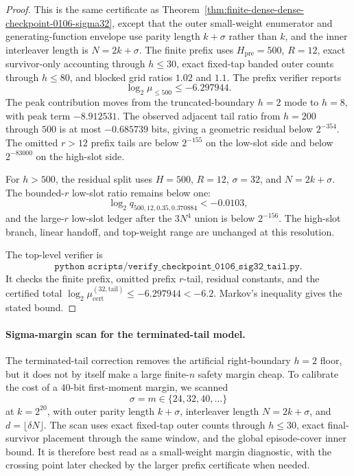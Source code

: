 \begin{proof}
This is the same certificate as Theorem~\ref{thm:finite-dense-dense-checkpoint-0106-sigma32}, except that the outer
small-weight enumerator and generating-function envelope use parity length \(k+\sigma\) rather than \(k\), and the inner
interleaver length is \(N=2k+\sigma\).  The finite prefix uses \(H_{\mathrm{pre}}=500\), \(R=12\), exact survivor-only
accounting through \(h\le30\), exact fixed-tap banded outer counts through \(h\le80\), and blocked grid ratios \(1.02\)
and \(1.1\).  The prefix verifier reports
\[
\log_2\mu_{\le500}\le -6.297944.
\]
The peak contribution moves from the truncated-boundary \(h=2\) mode to \(h=8\), with peak term \(-8.912531\).  The
observed adjacent tail ratio from \(h=200\) through \(500\) is at most \(-0.685739\) bits, giving a geometric residual
below \(2^{-354}\).  The omitted \(r>12\) prefix tails are below \(2^{-155}\) on the low-slot side and below \(2^{-83000}\)
on the high-slot side.

For \(h>500\), the residual split uses \(H=500\), \(R=12\), \(\sigma=32\), and \(N=2k+\sigma\).  The bounded-\(r\)
low-slot ratio remains below one:
\[
\log_2 q_{500,12,0.35,0.370884}<-0.0103,
\]
and the large-\(r\) low-slot ledger after the \(3N^4\) union is below \(2^{-156}\).  The high-slot branch, linear
handoff, and top-weight range are unchanged at this resolution.

The top-level verifier is
\[
\texttt{python scripts/verify\_checkpoint\_0106\_sig32\_tail.py}.
\]
It checks the finite prefix, omitted prefix \(r\)-tail, residual constants, and the certified total
\(\log_2\mu_{\mathrm{cert}}^{(32,\mathrm{tail})}\le -6.297944<-6.2\).  Markov's inequality gives the stated bound.
\end{proof}

\paragraph{Sigma-margin scan for the terminated-tail model.}
The terminated-tail correction removes the artificial right-boundary \(h=2\) floor, but it does not by itself make a
large finite-\(n\) safety margin cheap.  To calibrate the cost of a \(40\)-bit first-moment margin, we scanned
\[
\sigma=m\in\{24,32,40,\ldots\}
\]
at \(k=2^{20}\), with outer parity length \(k+\sigma\), interleaver length \(N=2k+\sigma\), and
\(d=\lfloor \delta N\rfloor\).  The scan uses exact fixed-tap outer counts through \(h\le30\), exact final-survivor
placement through the same window, and the global episode-cover inner bound.  It is therefore best read as a
small-weight margin diagnostic, with the crossing point later checked by the larger prefix certificate when needed.

